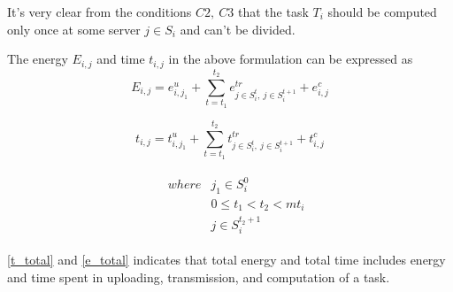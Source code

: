 \documentclass[conference]{IEEEtran}
\begin{document}
 It's very clear from the conditions $C2,\ C3$ that the task $T_i$ should be computed only once at some server $j\in S_i$ and can't be divided. 

  The energy $E_{i,j}$ and time $t_{i,j}$ in the above formulation can be expressed as
\begin{equation} \label{t_total}
E_{i,j}=e^u_{i,j_1}+\sum^{t_2}_{t=t_1}e^{tr}_{{j\in S_i^t},\ {j\in S_i^{t+1}}} +e^c_{i,j} 
\end{equation}

\begin{equation} \label{e_total}
t_{i,j}=t^u_{i,j_1}+\sum^{t_2}_{t=t_1}t^{tr}_{{j\in S_i^t},\ {j\in S_i^{t+1}}} +t^c_{i,j} 
\end{equation}

\[ \begin{array}{cc}
\  &  \begin{array}{cc}
where & j_1\in S^0_i \\ 
\  & 0\le t_1<t_2<mt_i \\ 
\  & j \in S^{t_2+1}_i \end{array}
 \end{array}
\] 

\eqref{t_total} and \eqref{e_total} indicates that total energy and total time includes energy and time spent in uploading, transmission, and computation of a task.
\end{document}
